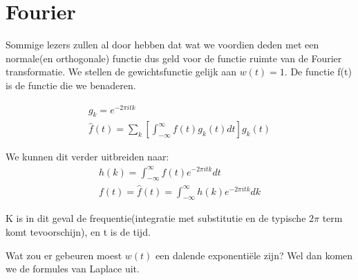 \documentclass[11pt]{article} %
\begin{document}
\section{Fourier}
Sommige lezers zullen al door hebben dat wat we voordien deden met een normale(en orthogonale) functie dus geld voor de functie ruimte van de Fourier transformatie. We stellen de gewichtsfunctie gelijk aan $w(t)=1$. De functie f(t) is de functie die we benaderen.

\begin{eqnarray}
	g_k=e^{-2\pi i t k} \\
	\hat{f}(t) =  \sum_k [\int_{-\infty}^{\infty} f(t) g_k(t) dt] g_k(t)
\end{eqnarray}

We kunnen dit verder uitbreiden naar:
\begin{eqnarray}
h(k) =  \int_{-\infty}^{\infty} f(t) e^{-2\pi i t k} dt \\
f(t) = \hat{f}(t) = \int_{-\infty}^{\infty} h(k) e^{-2\pi i t k} dk 
\end{eqnarray}

K is in dit geval de frequentie(integratie met substitutie en de typische $2 \pi$ term komt tevoorschijn), en t is de tijd.

Wat zou er gebeuren moest $w(t)$ een dalende exponentiële zijn? Wel dan komen we de formules van Laplace uit.
\end{document}

